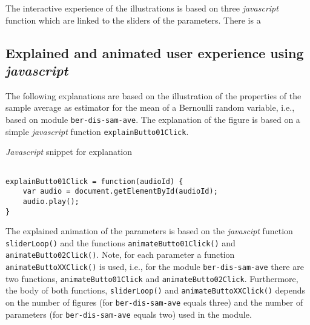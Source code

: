 \documentclass{article}
\begin{document}
 





The interactive experience of the illustrations is based on three \emph{javascript} function which are linked to the sliders of the parameters. 
%
There is a 



\subsection{Explained and animated user experience using \emph{javascript}}

The following explanations are based on the illustration of the properties of the sample average as estimator for the mean of a Bernoulli random variable, i.e., based on module \texttt{ber-dis-sam-ave}. 
%
The explanation of the figure is based on a simple \emph{javascript} function \texttt{explainButto01Click}.

\begin{CodeSnippet}[!hp]
	\centering
	\caption{\emph{Javascript} snippet for explanation}
\vspace{0.25cm}
	\begin{BVerbatim}

explainButto01Click = function(audioId) {
	var audio = document.getElementById(audioId);
	audio.play();
}

	\end{BVerbatim}
	\vspace*{-2mm}
	\label{JsCodSniExp}
\end{CodeSnippet}

The explained animation of the parameters is based on the \emph{javascipt} function \texttt{sliderLoop()} and the functions \texttt{animateButto01Click()} and \texttt{animateButto02Click()}. 
%
Note, for each parameter a function \texttt{animateButtoXXClick()} is used, i.e., for the module \texttt{ber-dis-sam-ave} there are two functions, \texttt{animateButto01Click} and \texttt{animateButto02Click}. 
%
%
Furthermore, the body of both functions, \texttt{sliderLoop()} and \texttt{animateButtoXXClick()} depends on the number of figures (for \texttt{ber-dis-sam-ave} equals three) and the number of parameters (for \texttt{ber-dis-sam-ave} equals two) used in the module.
\end{document}
